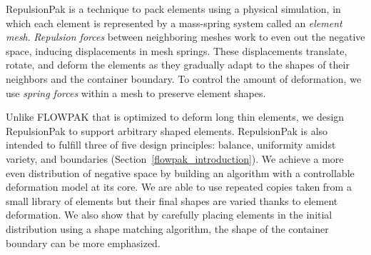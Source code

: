 \newtext
{
RepulsionPak is a technique
to pack elements using a physical simulation, 
in which each element is represented
by a mass-spring system called an \textit{element mesh}.  
\textit{Repulsion forces} between neighboring meshes work to even out the negative
space, inducing displacements in mesh springs.
These displacements translate, rotate, and deform the elements as 
they gradually adapt to the shapes of their neighbors
and the container boundary.  
To control the amount of deformation,
we use \textit{spring forces} within a mesh to preserve element shapes.}


\newtext
{
Unlike FLOWPAK that is optimized to deform long thin elements, 
we design RepulsionPak to support arbitrary shaped elements.
RepulsionPak is also intended to fulfill three of five design principles:
balance, uniformity amidst variety, and boundaries (Section~\ref{flowpak_introduction}). 
We achieve a more even distribution of negative space by building an algorithm with a controllable deformation model at its core. 
We are able to use repeated copies taken from a small library of elements 
but their final shapes are varied thanks to element deformation.
We also show that by carefully placing elements in the initial distribution using a shape matching algorithm, 
the shape of the container boundary can be more emphasized.
}








